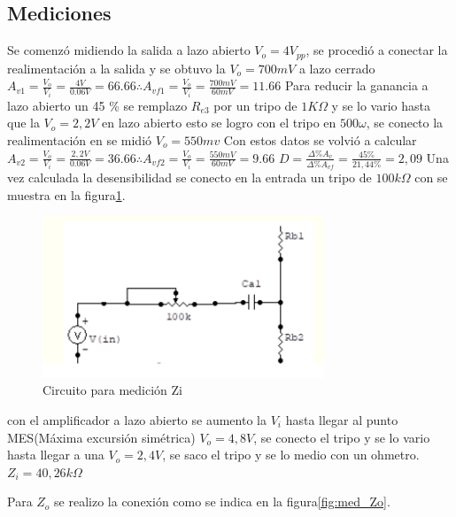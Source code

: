 \documentclass[12pt, letterpaper]{article}
\begin{document}
\subsection{Mediciones}
Se comenzó midiendo la salida a lazo abierto $V_o=4V_{pp}$, se procedió a conectar la realimentación a la salida y se obtuvo la $V_o=700mV$ a lazo cerrado
\singlespacing
$A_{v1}=\frac{V_o}{V_{i}}=\frac{4V}{0.06V}=66.66 \therefore A_{vf1}=\frac{V_o}{V_{i}}=\frac{700mV}{60mV}=11.66$
\singlespacing
Para reducir la ganancia a lazo abierto un 45 \% se remplazo $R_{e3}$ por un tripo de $1K\Omega$ y se lo vario hasta que la $V_o=2,2V$ en lazo abierto esto se logro con el tripo en $500\omega$, se conecto la realimentación en se midió $V_o=550mv$
\singlespacing
Con estos datos se volvió a calcular $A_{v2}=\frac{V_o}{V_{i}}=\frac{2,2V}{0.06V}=36.66 \therefore A_{vf2}=\frac{V_o}{V_{i}}=\frac{550mV}{60mV}=9.66$
\singlespacing
$D=\frac{\Delta \% A_v}{\Delta \% A_{vf}}=\frac{45\%}{21,44\%}=2,09$
\singlespacing
Una vez calculada la desensibilidad se conecto en la entrada un tripo de $100k\Omega$ con se muestra en la figura\ref{fig:med_Zi}.
\singlespacing
\begin{figure}[H]
	\centering
	\includegraphics[width=0.75\textwidth]{Imagenes/zi.png}
	\caption{Circuito para medición Zi}
	\label{fig:med_Zi}
\end{figure}
con el amplificador a lazo abierto se aumento la $V_i$ hasta llegar al punto MES(Máxima excursión simétrica) $V_o=4,8V$, se conecto el tripo y se lo vario hasta llegar a una $V_o=2,4V$, se saco el tripo y se lo medio con un ohmetro.
\singlespacing
$Z_i=40,26k\Omega$
\singlespacing

Para $Z_o$ se realizo la conexión como se indica en la figura\ref{fig:med_Zo}.
\end{document}
